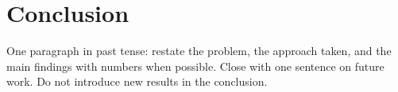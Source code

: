\section{Conclusion}
One paragraph in past tense: restate the problem, the approach taken,
and the main findings with numbers when possible. Close with one
sentence on future work. Do not introduce new results in the conclusion.
